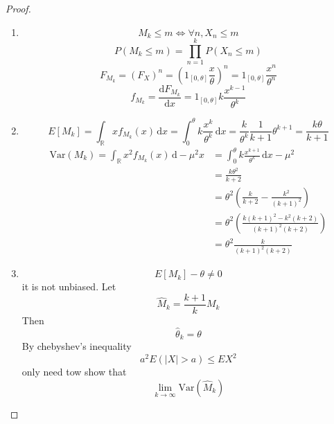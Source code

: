 \documentclass[../main.tex]{subfiles}
\begin{document}
\begin{proof}
  \begin{enumerate}
    \item   \[
    M_{k}\le m\iff  \forall n, X_{n}\le m
    \] \[
    P\left( M_{k}\le m \right)= \prod _{n = 1}^{k}P\left( X_{n}\le m \right)  
    \] \[
    F_{M_{k}}=  \left( F_{X} \right)^{n} = \left( 1_{\left[ 0, \theta  \right] }\frac{x }{ \theta  }  \right)^{n}= 1_{\left[ 0, \theta  \right] }\frac{x^{n} }{ \theta ^{n} }   
    \] \[
    f_{M_{k}}= \frac{\mathrm{d}F_{M_{k}}}{\mathrm{d}x}=  1_{\left[ 0, \theta  \right] } k\frac{x^{k-1} }{  \theta ^{k}} 
    \]
    \item  \[
    E\left[ M_{k} \right]= \int_{\mathbb{R} } x f_{M_{k}} \left( x \right)\,\mathrm{d} x=   \int_{0}^{ \theta }k\frac{x^{k} }{ \theta ^{k} }\,\mathrm{d} x = \frac{k }{ \theta ^{k} }\frac{1 }{k+ 1 } \theta ^{k+ 1}= \frac{k \theta  }{k+ 1 }   
    \] \[
 \begin{aligned}
    \mathrm{Var}\left( M_{k} \right)= \int_{\mathbb{R} }x^{2}f_{M_{k}}\left( x \right)\,\mathrm{d}-\mu ^{2} x&=  \int_{0}^{ \theta }k\frac{x^{k+ 1} }{ \theta ^{k} }\,\mathrm{d} x- \mu ^{2}\\ 
     &= \frac{k  \theta ^{2} }{k+ 2 } \\ 
      &  =  \theta ^{2}\left( \frac{k }{k+ 2 }-\frac{k^{2} }{\left( k+ 1 \right)^{2}  }   \right)  \\ 
     &=  \theta ^{2}\left( \frac{k\left( k+ 1 \right)^{2}-k^{2}\left( k+ 2 \right)   }{ \left( k+ 1 \right)^{2}\left( k+ 2 \right)  }  \right)\\ 
      &=  \theta ^{2}\frac{k }{\left( k+ 1 \right)^{2}\left( k+ 2 \right)   }  
 \end{aligned}
    \]
    \item \[
    E\left[ M_{k} \right]- \theta  \neq 0 
    \] it is not unbiased. Let \[
    \hat{M}_{k}= \frac{k+ 1 }{k }M_{k} 
    \] Then \[
    \hat{ \theta }_{k}=  \theta 
    \] By chebyshev's inequality \[
    a^{2}E\left( \left| X \right|> a  \right) \le EX^{2}
    \]only need tow show that  \[
    \lim_{k\to \infty} \mathrm{Var}\left( \hat{M}_{k} \right)
    \]
  \end{enumerate}
  
\end{proof}
\end{document}
